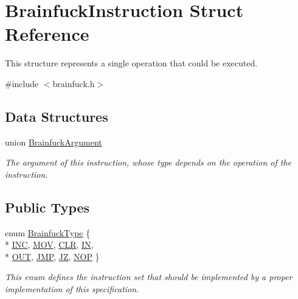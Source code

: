 \hypertarget{structBrainfuckInstruction}{}\section{Brainfuck\+Instruction Struct Reference}
\label{structBrainfuckInstruction}


This structure represents a single operation that could be executed.  




{\ttfamily \#include $<$brainfuck.\+h$>$}

\subsection*{Data Structures}
\begin{DoxyCompactItemize}
\item 
union \hyperlink{unionBrainfuckInstruction_1_1BrainfuckArgument}{Brainfuck\+Argument}
\begin{DoxyCompactList}\small\item\em The argument of this instruction, whose type depends on the operation of the instruction. \end{DoxyCompactList}\end{DoxyCompactItemize}
\subsection*{Public Types}
\begin{DoxyCompactItemize}
\item 
enum \hyperlink{group__ast_ga536105595916938ef76e66bb1cdf7b2b}{Brainfuck\+Type} \{ \\*
\hyperlink{group__ast_gga536105595916938ef76e66bb1cdf7b2bad430fd56820303a90e73ceb42ee688c3}{I\+N\+C}, 
\hyperlink{group__ast_gga536105595916938ef76e66bb1cdf7b2bac72dd0f54c974ce534e9b4416f4c8da6}{M\+O\+V}, 
\hyperlink{group__ast_gga536105595916938ef76e66bb1cdf7b2bac1fb5c131100a52e04b9b2a0b000529d}{C\+L\+R}, 
\hyperlink{group__ast_gga536105595916938ef76e66bb1cdf7b2baf95611cfc6305a83b391a18c19408d73}{I\+N}, 
\\*
\hyperlink{group__ast_gga536105595916938ef76e66bb1cdf7b2bac2a4e58f27685769e6f5785073520725}{O\+U\+T}, 
\hyperlink{group__ast_gga536105595916938ef76e66bb1cdf7b2ba5a4e446f0609b6e81c63cbaa2ad98e1d}{J\+M\+P}, 
\hyperlink{group__ast_gga536105595916938ef76e66bb1cdf7b2ba46c8adfb23d44852d6e1a04d96cb1d66}{J\+Z}, 
\hyperlink{group__ast_gga536105595916938ef76e66bb1cdf7b2ba02f03773b12443d2e4b834d140e5eb8f}{N\+O\+P}
 \}
\begin{DoxyCompactList}\small\item\em This enum defines the instruction set that should be implemented by a proper implementation of this specification. \end{DoxyCompactList}\end{DoxyCompactItemize}
